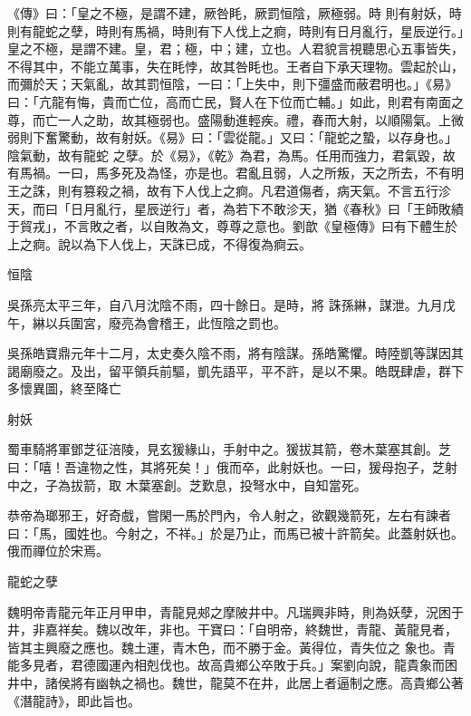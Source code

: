 \begin{pinyinscope}
 《傳》曰：「皇之不極，是謂不建，厥咎眊，厥罰恒陰，厥極弱。時
 則有射妖，時則有龍蛇之孽，時則有馬禍，時則有下人伐上之痾，時則有日月亂行，星辰逆行。」皇之不極，是謂不建。皇，君；極，中；建，立也。人君貌言視聽思心五事皆失，不得其中，不能立萬事，失在眊悖，故其咎眊也。王者自下承天理物。雲起於山，而彌於天；天氣亂，故其罰恒陰，一曰：「上失中，則下彊盛而蔽君明也。」《易》曰：「亢龍有悔，貴而亡位，高而亡民，賢人在下位而亡輔。」如此，則君有南面之尊，而亡一人之助，故其極弱也。盛陽動進輕疾。禮，春而大射，以順陽氣。上微弱則下奮驚動，故有射妖。《易》曰：「雲從龍。」又曰：「龍蛇之蟄，以存身也。」陰氣動，故有龍蛇
 之孽。於《易》，《乾》為君，為馬。任用而強力，君氣毀，故有馬禍。一曰，馬多死及為怪，亦是也。君亂且弱，人之所叛，天之所去，不有明王之誅，則有篡殺之禍，故有下人伐上之痾。凡君道傷者，病天氣。不言五行沴天，而曰「日月亂行，星辰逆行」者，為若下不敢沴天，猶《春秋》曰「王師敗績于貿戎」，不言敗之者，以自敗為文，尊尊之意也。劉歆《皇極傳》曰有下體生於上之痾。說以為下人伐上，天誅已成，不得復為痾云。



 恒陰



 吳孫亮太平三年，自八月沈陰不雨，四十餘日。是時，將
 誅孫綝，謀泄。九月戊午，綝以兵圍宮，廢亮為會稽王，此恆陰之罰也。



 吳孫皓寶鼎元年十二月，太史奏久陰不雨，將有陰謀。孫皓驚懼。時陸凱等謀因其謁廟廢之。及出，留平領兵前驅，凱先語平，平不許，是以不果。皓既肆虐，群下多懷異圖，終至降亡



 射妖



 蜀車騎將軍鄧芝征涪陵，見玄猨緣山，手射中之。猨拔其箭，卷木葉塞其創。芝曰：「嘻！吾違物之性，其將死矣！」俄而卒，此射妖也。一曰，猨母抱子，芝射中之，子為拔箭，取
 木葉塞創。芝歎息，投弩水中，自知當死。



 恭帝為瑯邪王，好奇戲，嘗閑一馬於門內，令人射之，欲觀幾箭死，左右有諫者曰：「馬，國姓也。今射之，不祥。」於是乃止，而馬已被十許箭矣。此蓋射妖也。俄而禪位於宋焉。



 龍蛇之孽



 魏明帝青龍元年正月甲申，青龍見郟之摩陂井中。凡瑞興非時，則為妖孽，況困于井，非嘉祥矣。魏以改年，非也。干寶曰：「自明帝，終魏世，青龍、黃龍見者，皆其主興廢之應也。魏土運，青木色，而不勝于金。黃得位，青失位之
 象也。青能多見者，君德國運內相剋伐也。故高貴鄉公卒敗于兵。」案劉向說，龍貴象而困井中，諸侯將有幽執之禍也。魏世，龍莫不在井，此居上者逼制之應。高貴鄉公著《潛龍詩》，即此旨也。




\end{pinyinscope}
